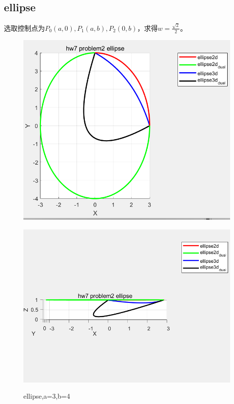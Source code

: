 \documentclass{article}
\begin{document}
	\subsection{ellipse}
	选取控制点为$P_0(a,0),P_1(a,b),P_2(0,b)$，求得$w=\frac{\sqrt{2}}{2}$。
	\begin{figure}[H]
		\centering
		\begin{minipage}{0.5\linewidth}
			\includegraphics[scale=0.6]{7_2_ellipse2d}
			\label{fig:72ellipse2d}
		\end{minipage}
	\hfill
		\begin{minipage}{0.5\linewidth}
			\includegraphics[scale=0.6]{7_2_ellipse3d}
			\label{fig:72ellipse3d}
		\end{minipage}
	\caption{ellipse,a=3,b=4}
	\label{ellipse}
	\end{figure}
	
\end{document}
